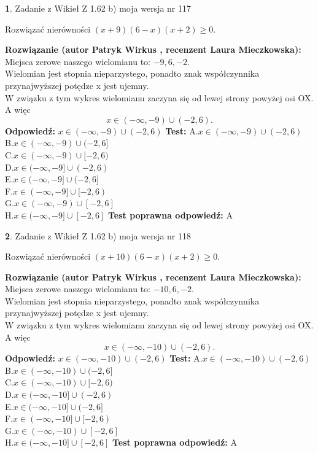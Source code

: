 \documentclass[12pt, a4paper]{article}
\theoremstyle{definition} %
\newtheorem{zad}{}
\newcommand{\zadStart}[1]{\begin{zad}#1\newline}
\newcommand{\zadStop}{\end{zad}}
\newcommand{\rozwStart}[2]{\noindent \textbf{Rozwiązanie (autor #1 , recenzent #2): }\newline}
\newcommand{\rozwStop}{\newline}
\newcommand{\odpStart}{\noindent \textbf{Odpowiedź:}\newline}
\newcommand{\odpStop}{\newline}
\newcommand{\testStart}{\noindent \textbf{Test:}\newline}
\newcommand{\testStop}{\newline}
\newcommand{\kluczStart}{\noindent \textbf{Test poprawna odpowiedź:}\newline}
\newcommand{\kluczStop}{\newline}
\begin{document}
\zadStart{Zadanie z Wikieł Z 1.62 b) moja wersja nr 117}

Rozwiązać nierówności $(x+9)(6-x)(x+2)\ge0$.
\zadStop
\rozwStart{Patryk Wirkus}{Laura Mieczkowska}
Miejsca zerowe naszego wielomianu to: $-9, 6, -2$.\\
Wielomian jest stopnia nieparzystego, ponadto znak współczynnika przy\linebreak najwyższej potędze x jest ujemny.\\ W związku z tym wykres wielomianu zaczyna się od lewej strony powyżej osi OX. A więc $$x \in (-\infty,-9) \cup (-2,6).$$
\rozwStop
\odpStart
$x \in (-\infty,-9) \cup (-2,6)$
\odpStop
\testStart
A.$x \in (-\infty,-9) \cup (-2,6)$\\
B.$x \in (-\infty,-9) \cup (-2,6]$\\
C.$x \in (-\infty,-9) \cup [-2,6)$\\
D.$x \in (-\infty,-9] \cup (-2,6)$\\
E.$x \in (-\infty,-9] \cup (-2,6]$\\
F.$x \in (-\infty,-9] \cup [-2,6)$\\
G.$x \in (-\infty,-9) \cup [-2,6]$\\
H.$x \in (-\infty,-9] \cup [-2,6]$
\testStop
\kluczStart
A
\kluczStop



\zadStart{Zadanie z Wikieł Z 1.62 b) moja wersja nr 118}

Rozwiązać nierówności $(x+10)(6-x)(x+2)\ge0$.
\zadStop
\rozwStart{Patryk Wirkus}{Laura Mieczkowska}
Miejsca zerowe naszego wielomianu to: $-10, 6, -2$.\\
Wielomian jest stopnia nieparzystego, ponadto znak współczynnika przy\linebreak najwyższej potędze x jest ujemny.\\ W związku z tym wykres wielomianu zaczyna się od lewej strony powyżej osi OX. A więc $$x \in (-\infty,-10) \cup (-2,6).$$
\rozwStop
\odpStart
$x \in (-\infty,-10) \cup (-2,6)$
\odpStop
\testStart
A.$x \in (-\infty,-10) \cup (-2,6)$\\
B.$x \in (-\infty,-10) \cup (-2,6]$\\
C.$x \in (-\infty,-10) \cup [-2,6)$\\
D.$x \in (-\infty,-10] \cup (-2,6)$\\
E.$x \in (-\infty,-10] \cup (-2,6]$\\
F.$x \in (-\infty,-10] \cup [-2,6)$\\
G.$x \in (-\infty,-10) \cup [-2,6]$\\
H.$x \in (-\infty,-10] \cup [-2,6]$
\testStop
\kluczStart
A
\kluczStop
\end{document}
